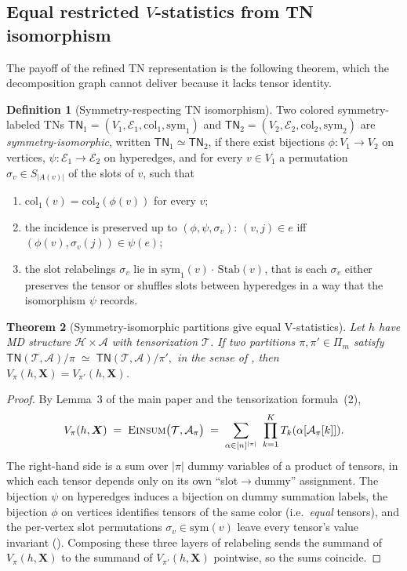 \documentclass[11pt]{article}
\newcommand{\Einsum}{\textsc{Einsum}}
\newcommand{\tensorcontraction}{\Einsum}
\newcommand{\calA}{\mathcal{A}}
\newcommand{\calH}{\mathcal{H}}
\newcommand{\calT}{\mathcal{T}}
\newcommand{\calE}{\mathcal{E}}
\newcommand{\bX}{\bm{X}}
\newcommand{\TN}{\mathsf{TN}}
\theoremstyle{plain}
\newtheorem{theorem}{Theorem}[section]
\theoremstyle{definition}
\newtheorem{definition}[theorem]{Definition}
\begin{document}
\subsection{Equal restricted $V$-statistics from TN isomorphism}

The payoff of the refined TN representation is the following theorem, which
the decomposition graph cannot deliver because it lacks tensor identity.

\begin{definition}[Symmetry-respecting TN isomorphism]
\label{def:tn-iso}
Two colored symmetry-labeled TNs
$\TN_1=(V_1,\calE_1,\mathrm{col}_1,\mathrm{sym}_1)$ and
$\TN_2=(V_2,\calE_2,\mathrm{col}_2,\mathrm{sym}_2)$ are
\emph{symmetry-isomorphic}, written $\TN_1\simeq \TN_2$, if there exist
bijections $\phi:V_1\to V_2$ on vertices, $\psi:\calE_1\to\calE_2$ on
hyperedges, and for every $v\in V_1$ a permutation
$\sigma_v\in S_{|A(v)|}$ of the slots of $v$, such that
\begin{enumerate}[label=\textup{(\roman*)},leftmargin=2em]
\item $\mathrm{col}_1(v)=\mathrm{col}_2(\phi(v))$ for every $v$;
\item the incidence is preserved up to $(\phi,\psi,\sigma_v)$: $(v,j)\in e$ iff
$(\phi(v),\sigma_v(j))\in\psi(e)$;
\item the slot relabelings $\sigma_v$ lie in $\mathrm{sym}_1(v)\cdot\,\mathrm{Stab}(v)$,
that is each $\sigma_v$ either preserves the tensor or shuffles slots between
hyperedges in a way that the isomorphism $\psi$ records.
\end{enumerate}
\end{definition}

\begin{theorem}[Symmetry-isomorphic partitions give equal V-statistics]
\label{thm:equal-vstats}
Let $h$ have MD structure $\calH\times\calA$ with tensorization $\calT$.  If
two partitions $\pi,\pi'\in\Pi_m$ satisfy
\(
   \TN(\calT,\calA)/\pi \;\simeq\; \TN(\calT,\calA)/\pi',
\)
in the sense of , then $V_\pi(h,\bX)=V_{\pi'}(h,\bX)$.
\end{theorem}

\begin{proof}
By Lemma~3 of the main paper and the tensorization formula~(2),
\[
   V_\pi(h,\bX) \;=\; \tensorcontraction\bigl(\calT,\calA_\pi\bigr)
                \;=\; \sum_{\alpha\in[n]^{|\pi|}}\ \prod_{k=1}^{K} T_k(\alpha[\calA_\pi[k]]).
\]
The right-hand side is a sum over $|\pi|$ dummy variables of a product of
tensors, in which each tensor depends only on its own ``slot$\to$dummy''
assignment.  The bijection $\psi$ on hyperedges induces a bijection on dummy
summation labels, the bijection $\phi$ on vertices identifies tensors of the
same color (i.e.\ \emph{equal} tensors), and the per-vertex slot permutations
$\sigma_v\in\mathrm{sym}(v)$ leave every tensor's value invariant
().  Composing these three layers of relabeling sends the
summand of $V_\pi(h,\bX)$ to the summand of $V_{\pi'}(h,\bX)$
pointwise, so the sums coincide.
\end{proof}
\end{document}
